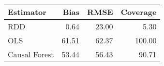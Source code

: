 \begin{table}[ht]
\centering
\begin{tabular}{lrrr}
  \hline
Estimator & Bias & RMSE & Coverage \\ 
  \hline
RDD & 0.64 & 23.00 & 5.30 \\ 
  OLS & 61.51 & 62.37 & 100.00 \\ 
  Causal Forest & 53.44 & 56.43 & 90.71 \\ 
   \hline
\end{tabular}
\end{table}
